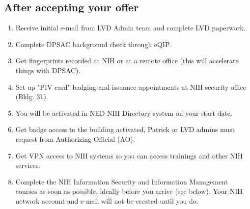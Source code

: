 \documentclass[10pt, letterpaper, twocolumn]{article} %
\begin{document}
\subsection{After accepting your offer}
\begin{enumerate}
\item Receive initial e-mail from LVD Admin team and complete LVD paperwork.
\item Complete DPSAC background check through eQIP.
\item Get fingerprints recorded at NIH or at a remote office (this will accelerate things with DPSAC).
\item Set up "PIV card" badging and issuance appointments at NIH security office (Bldg. 31).
\item You will be activated in NED NIH Directory system on your start date.
\item Get badge access to the building activated, Patrick or LVD admins must request from Authorizing Official (AO).
\item Get VPN access to NIH systems so you can access trainings and other NIH services.
\item Complete the NIH Information Security and Information Management courses as soon as possible, ideally before you arrive (see below). Your NIH network account and e-mail will not be created until you do.
\end{enumerate}
\end{document}
